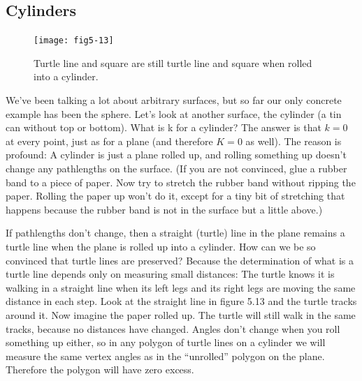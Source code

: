 \documentclass{book}
\begin{document}
\subsection{Cylinders}

\begin{figure}
\begin{center}
\texttt{[image: fig5-13]}
\caption{Turtle line and square are still turtle line and square when rolled into a cylinder.}
\end{center}
\end{figure}


We've been talking a lot about arbitrary surfaces, but so far our only
concrete example has been the sphere. Let's look at another surface, the
cylinder (a tin can without top or bottom). What is k for a cylinder?
The answer is that $k = 0$ at every point, just as for a plane (and
therefore $K = 0$ as well). The reason is profound: A cylinder is just a
plane rolled up, and rolling something up doesn't change any pathlengths
on the surface. (If you are not convinced, glue a rubber band to a piece
of paper. Now try to stretch the rubber band without ripping the paper.
Rolling the paper up won't do it, except for a tiny bit of stretching that
happens because the rubber band is not in the surface but a little above.)

If pathlengths don't change, then a straight (turtle) line in the plane
remains a turtle line when the plane is rolled up into a cylinder. How
can we be so convinced that turtle lines are preserved? Because the
determination of what is a turtle line depends only on measuring small
distances: The turtle knows it is walking in a straight line when its left
legs and its right legs are moving the same distance in each step. Look
at the straight line in figure 5.13 and the turtle tracks around it. Now
imagine the paper rolled up. The turtle will still walk in the same tracks,
because no distances have changed. Angles don't change when you roll
something up either, so in any polygon of turtle lines on a cylinder we
will measure the same vertex angles as in the ``unrolled'' polygon on the
plane. Therefore the polygon will have zero excess.
\end{document}
